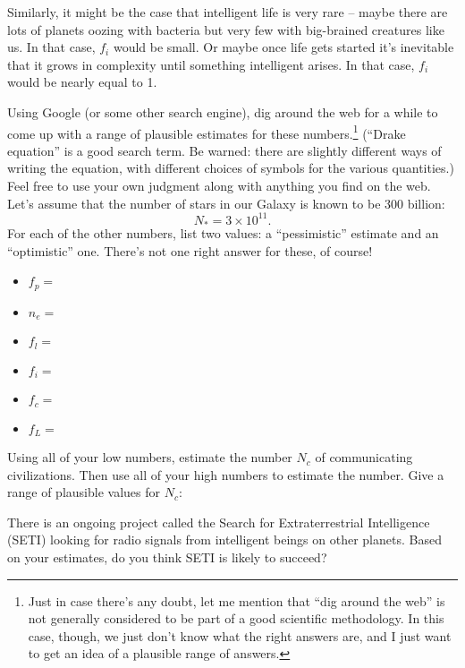 Similarly, it might be the case that intelligent life is very rare
-- maybe there are lots of planets oozing with bacteria but very few
with big-brained creatures like us.  In that case, $f_i$ would be small.
Or maybe once life gets started it's inevitable that it grows in complexity
until something intelligent arises.  In that case, $f_i$ would be nearly equal
to 1.

Using Google (or some other search engine), dig around the web for a while
to come up with a range of plausible estimates for these numbers.\footnote{Just
in case there's any doubt, let me mention that ``dig around the web''
is not generally considered to be part of a good scientific methodology.
In this case, though, we just don't know what the right answers are,
and I just want to get an idea of a plausible range of answers.}
  (``Drake
equation'' is a good search term.  Be warned: there are slightly
different ways of writing the equation, with different choices
of symbols for the various quantities.)  Feel free to use your own
judgment along with anything you find on the web.
Let's assume
that the number of stars in our Galaxy is known to be 300 billion:
$$
N_*=3\times 10^{11}.
$$
For each of the other numbers, list two values: a ``pessimistic'' estimate
and an ``optimistic'' one.  There's not one right answer for these,
of course!

\begin{itemize}
\item $f_p=$
\item $n_e=$
\item $f_l=$
\item $f_i=$
\item $f_c=$ 
\item $f_L=$ 
\end{itemize}

Using all of your low numbers, estimate the number $N_c$ of communicating
civilizations.  Then use all of your high numbers to estimate the number.
Give a range of plausible values for $N_c$:

\vskip 1in

There is an ongoing project called the Search for Extraterrestrial
Intelligence (SETI) looking for radio signals from intelligent beings
on other planets.  Based on your estimates, do you think SETI is likely
to succeed?  

